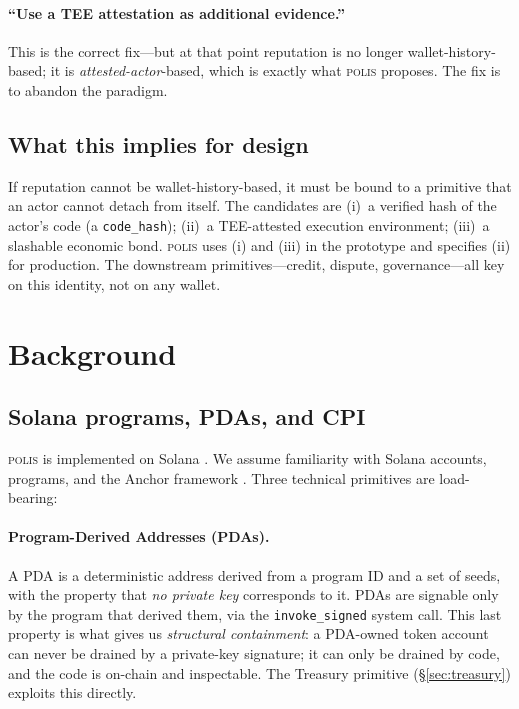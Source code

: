 \documentclass[10pt,conference,letterpaper]{IEEEtran}
\theoremstyle{definition}
\newcommand{\polis}{\textsc{polis}\xspace}
\newcommand{\codehash}{\texttt{code\_hash}}
\begin{document}
\paragraph{``Use a TEE attestation as additional evidence.''}
This is the correct fix---but at that point reputation is no longer
wallet-history-based; it is \emph{attested-actor}-based, which is exactly
what \polis proposes. The fix is to abandon the paradigm.

\subsection{What this implies for design}

If reputation cannot be wallet-history-based, it must be bound to a
primitive that an actor cannot detach from itself. The candidates are
(i)~a verified hash of the actor's code (a \codehash); (ii)~a
TEE-attested execution environment; (iii)~a slashable economic bond.
\polis uses (i) and (iii) in the prototype and specifies (ii) for
production. The downstream primitives---credit, dispute, governance---all
key on this identity, not on any wallet.

\section{Background}\label{sec:background}

\subsection{Solana programs, PDAs, and CPI}

\polis is implemented on Solana \cite{yakovenko2018solana}. We assume
familiarity with Solana accounts, programs, and the Anchor framework
\cite{anchor2024framework}. Three technical primitives are
load-bearing:

\paragraph{Program-Derived Addresses (PDAs).}
A PDA is a deterministic address derived from a program ID and a set of
seeds, with the property that \emph{no private key} corresponds to it.
PDAs are signable only by the program that derived them, via the
\texttt{invoke\_signed} system call. This last property is what gives
us \emph{structural containment}: a PDA-owned token account can never
be drained by a private-key signature; it can only be drained by code,
and the code is on-chain and inspectable. The Treasury primitive
(\S\ref{sec:treasury}) exploits this directly.
\end{document}
